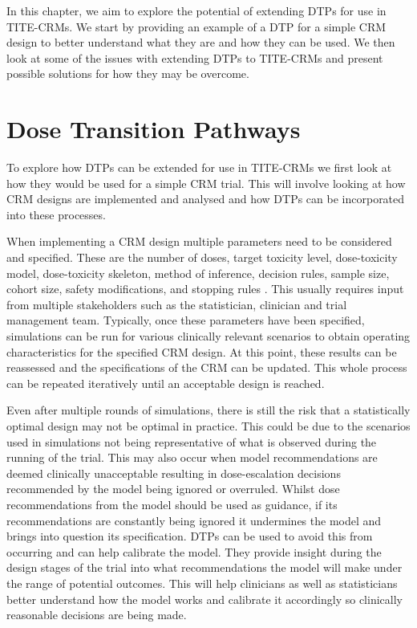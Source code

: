 In this chapter, we aim to explore the potential of extending DTPs for use in TITE-CRMs. We start by providing an example of a DTP for a simple CRM design to better understand what they are and how they can be used. We then look at some of the issues with extending DTPs to TITE-CRMs and present possible solutions for how they may be overcome.



\section{Dose Transition Pathways}
\label{tite-dtp:DTPs}

To explore how DTPs can be extended for use in TITE-CRMs we first look at how they would be used for a simple CRM trial. This will involve looking at how CRM designs are implemented and analysed and how DTPs can be incorporated into these processes. 

When implementing a CRM design multiple parameters need to be considered and specified. These are the number of doses, target toxicity level, dose-toxicity model, dose-toxicity skeleton, method of inference, decision rules, sample size, cohort size, safety modifications, and stopping rules \cite{wheelerHowDesignDosefinding2019}. This usually requires input from multiple stakeholders such as the statistician, clinician and trial management team. Typically, once these parameters have been specified, simulations can be run for various clinically relevant scenarios to obtain operating characteristics for the specified CRM design. At this point, these results can be reassessed and the specifications of the CRM can be updated. This whole process can be repeated iteratively until an acceptable design is reached. 

Even after multiple rounds of simulations, there is still the risk that a statistically optimal design may not be optimal in practice. This could be due to the scenarios used in simulations not being representative of what is observed during the running of the trial. This may also occur when model recommendations are deemed clinically unacceptable resulting in dose-escalation decisions recommended by the model being ignored or overruled. Whilst dose recommendations from the model should be used as guidance, if its recommendations are constantly being ignored it undermines the model and brings into question its specification. DTPs can be used to avoid this from occurring and can help calibrate the model. They provide insight during the design stages of the trial into what recommendations the model will make under the range of potential outcomes. This will help clinicians as well as statisticians better understand how the model works and calibrate it accordingly so clinically reasonable decisions are being made.   

